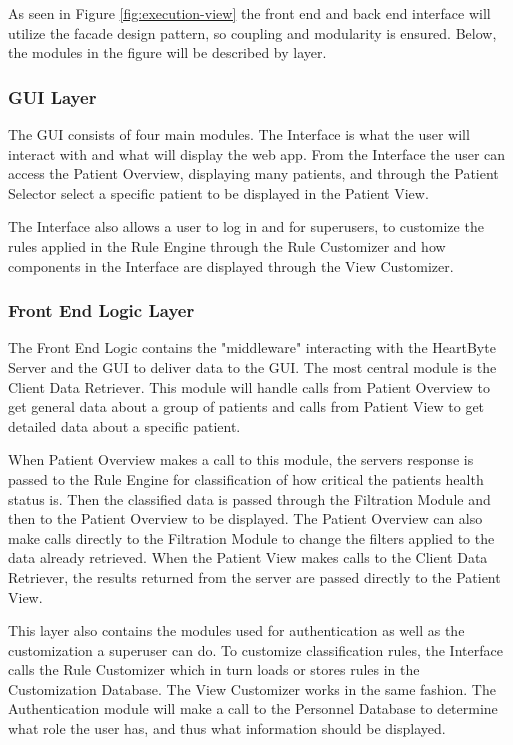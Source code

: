\documentclass{article}
\begin{document}
As seen in Figure \ref{fig:execution-view} the front end and back end interface will utilize the facade design pattern, so coupling and modularity is ensured. Below, the modules in the figure will be described by layer.

\subsubsection{GUI Layer}
The GUI consists of four main modules. The Interface is what the user will interact with and what will display the web app. From the Interface the user can access the Patient Overview, displaying many patients, and through the Patient Selector select a specific patient to be displayed in the Patient View. 

The Interface also allows a user to log in and for superusers, to customize the rules applied in the Rule Engine through the Rule Customizer and how components in the Interface are displayed through the View Customizer.

\subsubsection{Front End Logic Layer}
The Front End Logic contains the "middleware" interacting with the HeartByte Server and the GUI to deliver data to the GUI. The most central module is the Client Data Retriever. This module will handle calls from Patient Overview to get general data about a group of patients and calls from Patient View to get detailed data about a specific patient. 

When Patient Overview makes a call to this module, the servers response is passed to the Rule Engine for classification of how critical the patients health status is. Then the classified data is passed through the Filtration Module and then to the Patient Overview to be displayed. The Patient Overview can also make calls directly to the Filtration Module to change the filters applied to the data already retrieved. When the Patient View makes calls to the Client Data Retriever, the results returned from the server are passed directly to the Patient View.

This layer also contains the modules used for authentication as well as the customization a superuser can do. To customize classification rules, the Interface calls the Rule Customizer which in turn loads or stores rules in the Customization Database. The View Customizer works in the same fashion. The Authentication module will make a call to the Personnel Database to determine what role the user has, and thus what information should be displayed.
\end{document}
